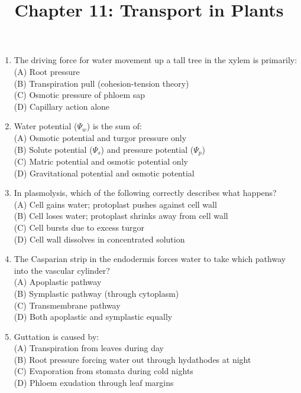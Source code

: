 \documentclass{article}
\begin{document}
\title{Chapter 11: Transport in Plants}
\date{}
\maketitle

\begin{enumerate}[label=Q\arabic*.]

\item The driving force for water movement up a tall tree in the xylem is primarily:
\\(A) Root pressure
\\(B) Transpiration pull (cohesion-tension theory)
\\(C) Osmotic pressure of phloem sap
\\(D) Capillary action alone

\item Water potential ($\Psi_w$) is the sum of:
\\(A) Osmotic potential and turgor pressure only
\\(B) Solute potential ($\Psi_s$) and pressure potential ($\Psi_p$)
\\(C) Matric potential and osmotic potential only
\\(D) Gravitational potential and osmotic potential

\item In plasmolysis, which of the following correctly describes what happens?
\\(A) Cell gains water; protoplast pushes against cell wall
\\(B) Cell loses water; protoplast shrinks away from cell wall
\\(C) Cell bursts due to excess turgor
\\(D) Cell wall dissolves in concentrated solution

\item The Casparian strip in the endodermis forces water to take which pathway into the vascular cylinder?
\\(A) Apoplastic pathway
\\(B) Symplastic pathway (through cytoplasm)
\\(C) Transmembrane pathway
\\(D) Both apoplastic and symplastic equally

\item Guttation is caused by:
\\(A) Transpiration from leaves during day
\\(B) Root pressure forcing water out through hydathodes at night
\\(C) Evaporation from stomata during cold nights
\\(D) Phloem exudation through leaf margins


\end{enumerate}
\end{document}
